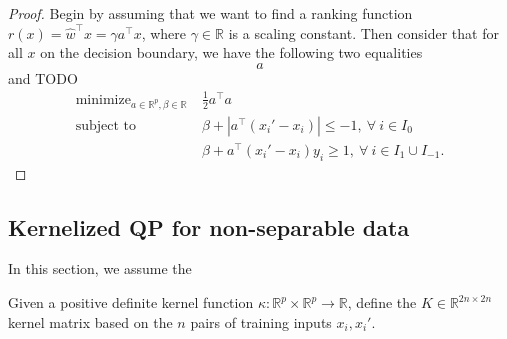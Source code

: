 \documentclass{article}
\newcommand{\RR}{\mathbb R}
\DeclareMathOperator*{\minimize}{minimize}
\begin{document}
\begin{proof}
  Begin by assuming that we want to find a ranking function $r(x)=\hat
  w^\intercal x = \gamma a^\intercal x$, where $\gamma\in\RR$ is a
  scaling constant.  Then consider that for all $x$ on the decision
  boundary, we have the following two equalities
  \begin{equation}
    \label{eq:dec-boundary-rank}
    a
  \end{equation}
and TODO
\begin{equation}
  \label{eq:max-margin-qp}
  \begin{aligned}
    \minimize_{a\in\RR^p, \beta\in\RR}\ & \frac 1 2 a^\intercal a  \\
    \text{subject to}\ & \beta + |a^\intercal (x_i'-x_i)| \leq -1,\
    \forall\  i\in I_0\\
    & \beta + a^\intercal(x_i'-x_i)y_i \geq 1,\ \forall\ i\in I_1\cup I_{-1}.
  \end{aligned}
\end{equation}
\end{proof}


\subsection{Kernelized QP for non-separable data}

In this section, we assume the 

Given a positive definite kernel function $\kappa:\RR^p\times
\RR^p\rightarrow\RR$, define the $K\in\RR^{2n\times 2n}$ kernel matrix
based on the $n$ pairs of training inputs $x_i,x_i'$.

\end{document}
